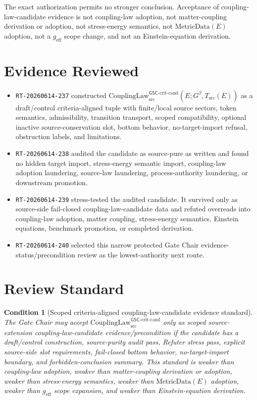 \documentclass[11pt]{article}
\newcommand{\Gbeta}{G^\beta}
\newcommand{\geff}{g_{\mathrm{eff}}}
\newcommand{\CouplingLawCrit}{\mathrm{CouplingLaw}^{\mathsf{GSC}\mbox{-}\mathrm{crit}\mbox{-}\mathrm{cand}}_{\mathrm{src}}}
\newcommand{\MetricData}{\mathrm{MetricData}}
\newtheorem{condition}{Condition}
\begin{document}
The exact authorization permits no stronger conclusion. Acceptance of
coupling-law-candidate evidence is not coupling-law adoption, not
matter-coupling derivation or adoption, not stress-energy semantics, not
\(\MetricData(E)\) adoption, not a \(\geff\) scope change, and not an
Einstein-equation derivation.

\section{Evidence Reviewed}

\begin{itemize}[leftmargin=*]
  \item \texttt{RT-20260614-237} constructed
  \(\CouplingLawCrit(E;\Gbeta,T_{\mathrm{src}}(E))\) as a draft/control
  criteria-aligned tuple with finite/local source sectors, token semantics,
  admissibility, transition transport, scoped compatibility, optional inactive
  source-conservation slot, bottom behavior, no-target-import refusal,
  obstruction labels, and limitations.
  \item \texttt{RT-20260614-238} audited the candidate as source-pure as
  written and found no hidden target import, stress-energy semantic import,
  coupling-law adoption laundering, source-law laundering, process-authority
  laundering, or downstream promotion.
  \item \texttt{RT-20260614-239} stress-tested the audited candidate. It
  survived only as source-side fail-closed coupling-law-candidate data and
  refuted overreads into coupling-law adoption, matter coupling,
  stress-energy semantics, Einstein equations, benchmark promotion, or
  completed derivation.
  \item \texttt{RT-20260614-240} selected this narrow protected Gate Chair
  evidence-status/precondition review as the lowest-authority next route.
\end{itemize}

\section{Review Standard}

\begin{condition}[Scoped criteria-aligned coupling-law-candidate evidence standard]
The Gate Chair may accept \(\CouplingLawCrit\) only as scoped source-extension
coupling-law-candidate evidence/precondition if the candidate has a
draft/control construction, source-purity audit pass, Refuter stress pass,
explicit source-side slot requirements, fail-closed bottom behavior,
no-target-import boundary, and forbidden-conclusion summary. This standard is
weaker than coupling-law adoption, weaker than matter-coupling derivation or
adoption, weaker than stress-energy semantics, weaker than \(\MetricData(E)\)
adoption, weaker than \(\geff\) scope expansion, and weaker than
Einstein-equation derivation.
\end{condition}
\end{document}
